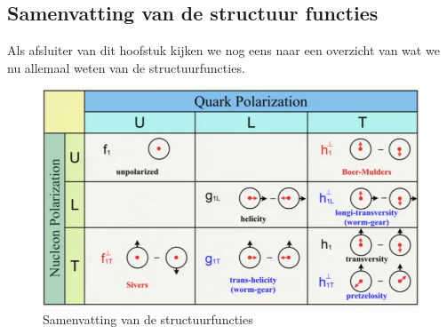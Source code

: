 \documentclass[../main.tex]{subfiles}
\begin{document}
\subsection{Samenvatting van de structuur functies}%
\label{sub:samenvatting_van_de_structuur_functies}

Als afsluiter van dit hoofstuk kijken we nog eens naar een overzicht van wat we nu allemaal weten van de structuurfuncties.

\begin{figure}[h]
    \centering
    \includegraphics[width=0.5\linewidth]{DIS_nucleon_structuur_pdf/struct_func_samenvatting.png}
    \caption{Samenvatting van de structuurfuncties}%
    \label{fig:struct_func_samenvatting}
\end{figure}
\end{document}
